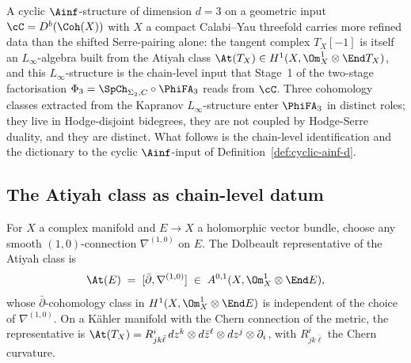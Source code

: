 A cyclic $\Ainf$-structure of dimension $d = 3$ on a geometric input
$\cC = D^b(\Coh(X))$ with $X$ a compact Calabi--Yau threefold carries
more refined data than the shifted Serre-pairing alone: the tangent
complex $T_X[-1]$ is itself an $L_\infty$-algebra built from the
Atiyah class $\At(T_X) \in H^1(X, \Om^1_X \otimes \End T_X)$, and this
$L_\infty$-structure is the chain-level input that Stage~1 of the
two-stage factorisation $\Phi_3 = \SpCh_{\Sigma_2, C} \circ \PhiFA_3$
reads from $\cC$. Three cohomology classes extracted from the Kapranov
$L_\infty$-structure enter $\PhiFA_3$ in distinct roles; they live in
Hodge-disjoint bidegrees, they are not coupled by Hodge-Serre duality,
and they are distinct. What follows is the chain-level
identification and the dictionary to the cyclic $\Ainf$-input of
Definition~\ref{def:cyclic-ainf-d}.

\subsection{The Atiyah class as chain-level datum}
\label{subsec:cycainf-atiyah-chain-level}

\begin{definition}
\label{def:cycainf-atiyah-dolbeault}
For $X$ a complex manifold and $E \to X$ a holomorphic vector bundle,
choose any smooth $(1,0)$-connection $\nabla^{(1,0)}$ on $E$. The
Dolbeault representative of the Atiyah class is
\[
 \At(E) \;=\; [\bar\partial, \nabla^{(1,0)}] \;\in\; A^{0,1}(X,
 \Om^1_X \otimes \End E),
\]
whose $\bar\partial$-cohomology class in $H^1(X, \Om^1_X \otimes \End E)$
is independent of the choice of $\nabla^{(1,0)}$. On a K\"ahler manifold
with the Chern connection of the metric, the representative is
$\At(T_X) = R^i_{j k \bar \ell}\, dz^k \otimes d\bar z^\ell \otimes dz^j
\otimes \partial_i$, with $R^i_{j k \bar \ell}$ the Chern curvature.
\end{definition}


